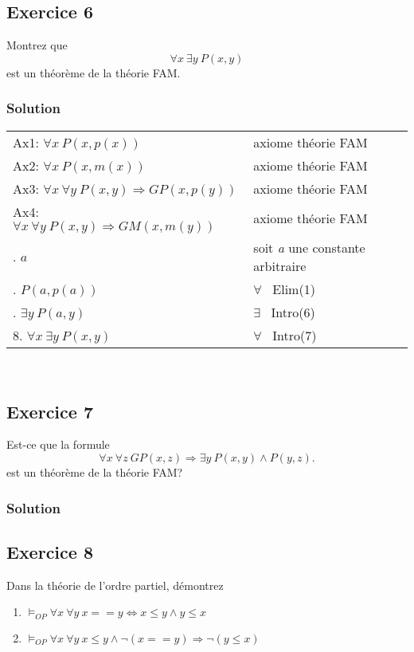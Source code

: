 \subsection*{Exercice 6}
Montrez que 
$$
\forall x \ \exists y \ P(x, y)
$$
est un th\'{e}or\`{e}me de la th\'{e}orie FAM.


    \subsubsection*{Solution}
    \begin{tabular}{|l|l|}
    \hline 
        Ax1: $\forall x \ P(x, p(x))$ & axiome th\'{e}orie FAM \\
        Ax2: $\forall x \ P(x, m(x))$ & axiome th\'{e}orie FAM \\
        Ax3: $\forall x \ \forall y \ P(x, y) \Rightarrow GP(x, p(y))$ & axiome th\'{e}orie FAM  \\
        Ax4: $\forall x \ \forall y \ P(x, y) \Rightarrow GM(x, m(y))$ & axiome th\'{e}orie FAM \\
        \indent 5. $ a $ & soit \textit{a} une constante arbitraire \\
        \indent 6. $ P(a, p(a)) $ & $\forall$ \ Elim(1)\\
        \indent 7.  $\exists y \ P(a,y) $ & $\exists$ \ Intro(6)\\
        8. $ \forall x\ \exists y \ P(x,y) $ & $\forall$ \ Intro(7)\\ 
    \hline
    \end{tabular}\\

\subsection*{Exercice 7}
Est-ce que la formule
$$
\forall x \ \forall z \ GP(x, z) \Rightarrow \exists y \ P(x, y) \wedge P(y, z).
$$
est un th\'{e}or\`{e}me de la th\'{e}orie FAM?


    \subsubsection*{Solution}

\subsection*{Exercice 8}
Dans la th\'{e}orie de l'ordre partiel, d\'{e}montrez
\begin{enumerate}
\item $\models_{OP} \forall x \ \forall y \ x == y \Leftrightarrow x \leq y \wedge y \leq x$
\item $\models_{OP} \forall x \ \forall y \ x \leq y \wedge \neg (x == y) \Rightarrow \neg (y \leq x)$
\end{enumerate}

